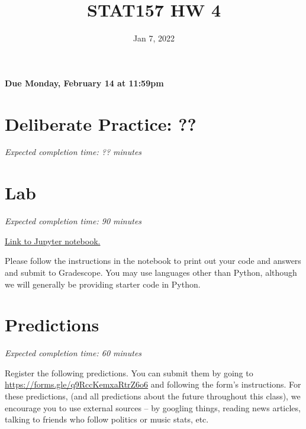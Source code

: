 \documentclass[11pt]{article}
\title{STAT157 HW 4}
\date{Jan 7, 2022}
\begin{document}
\maketitle

\hfill \textbf{Due Monday, February 14 at 11:59pm}

\section*{Deliberate Practice: ??}

\emph{Expected completion time: ?? minutes}

\section*{Lab}

\emph{Expected completion time: 90 minutes}

\href{https://datahub.berkeley.edu/hub/user-redirect/git-pull?repo=https%3A%2F%2Fgithub.com%2[…]stat-157-260-website%2Fhw%2Fhw4%2Fhw4lab.ipynb&branch=main}{Link to Jupyter notebook.} 

Please follow the instructions in the notebook to print out your code and answers and submit to Gradescope. You may use languages other than Python, although we will generally be providing starter code in Python.

\section*{Predictions}

\emph{Expected completion time: 60 minutes}

Register the following predictions. You can submit them by going to \url{https://forms.gle/q9RccKemxaRtrZ6o6} and following the form's instructions. For these predictions, (and all predictions about the future throughout this class), we encourage you to use external sources -- by googling things, reading news articles, talking to friends who follow politics or music stats, etc.
\end{document}
